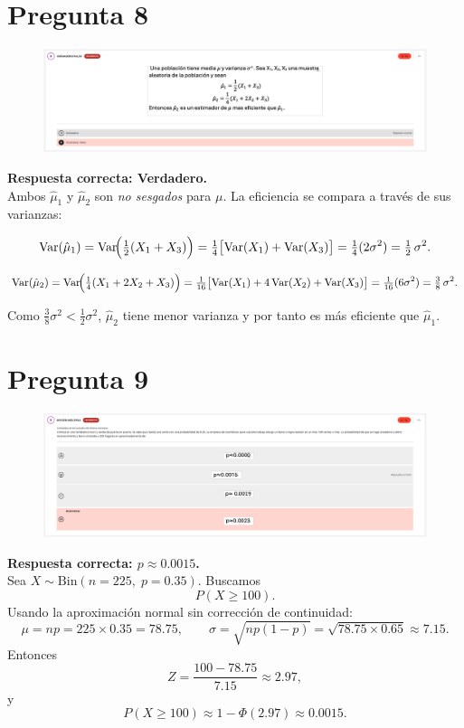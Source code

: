 \documentclass[10pt]{article}
\DeclareMathOperator{\Var}{Var}
\begin{document}
\section{Pregunta 8}
\begin{figure}[H]
    \centering
    \includegraphics[width=1\textwidth]{images/pregunta8.png}
\end{figure}

\textbf{Respuesta correcta: Verdadero.} \\ 
Ambos \(\hat\mu_1\) y \(\hat\mu_2\) son \emph{no sesgados} para \(\mu\). La eficiencia se compara a través de sus varianzas:

\[
\Var(\hat\mu_1)
= \Var\!\Bigl(\tfrac{1}{2}(X_1 + X_3)\Bigr)
= \tfrac{1}{4}\bigl[\Var(X_1)+\Var(X_3)\bigr]
= \tfrac{1}{4}(2\sigma^2)
= \tfrac{1}{2}\,\sigma^2.
\]

\[
\Var(\hat\mu_2)
= \Var\!\Bigl(\tfrac{1}{4}(X_1 + 2X_2 + X_3)\Bigr)
= \tfrac{1}{16}\bigl[\Var(X_1)+4\Var(X_2)+\Var(X_3)\bigr]
= \tfrac{1}{16}(6\sigma^2)
= \tfrac{3}{8}\,\sigma^2.
\]

Como 
\(\tfrac{3}{8}\sigma^2 < \tfrac{1}{2}\sigma^2\),
\(\hat\mu_2\) tiene menor varianza y por tanto es más eficiente que \(\hat\mu_1\).
\section{Pregunta 9}
\begin{figure}[H]
    \centering
    \includegraphics[width=1\textwidth]{images/pregunta9.png}
\end{figure}

\textbf{Respuesta correcta: \(p \approx 0.0015\).} \\ 
Sea \(X\sim \mathrm{Bin}(n=225,\;p=0.35)\). Buscamos  
\[
P(X \ge 100).
\]  
Usando la aproximación normal sin corrección de continuidad:
\[
\mu = np = 225 \times 0.35 = 78.75,\qquad
\sigma = \sqrt{np(1-p)} = \sqrt{78.75 \times 0.65}\approx 7.15.
\]
Entonces
\[
Z = \frac{100 - 78.75}{7.15} \approx 2.97,
\]
y
\[
P(X\ge100)\approx 1 - \Phi(2.97) \approx 0.0015.
\]
\end{document}
